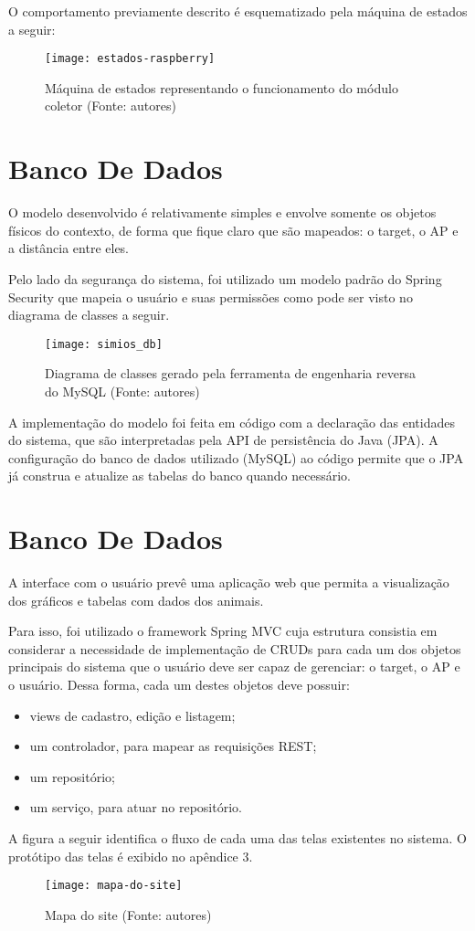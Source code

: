 O comportamento previamente descrito é esquematizado pela máquina de estados a seguir:

\begin{figure}[ht]
  \centering
    \texttt{[image: estados-raspberry]}
  \caption{Máquina de estados representando o funcionamento do módulo coletor (Fonte: autores)}
\end{figure}
\FloatBarrier

\section{Banco De Dados}

O modelo desenvolvido é relativamente simples e envolve somente os objetos físicos do contexto, de forma que fique claro que são mapeados: o target, o AP e a distância entre eles.

Pelo lado da segurança do sistema, foi utilizado um modelo padrão do Spring Security que mapeia o usuário e suas permissões como pode ser visto no diagrama de classes a seguir.

\begin{figure}[ht]
  \centering
    \texttt{[image: simios\_db]}
  \caption{Diagrama de classes gerado pela ferramenta de engenharia reversa do MySQL (Fonte: autores)}
\end{figure}
\FloatBarrier

A implementação do modelo foi feita em código com a declaração das entidades do sistema, que são interpretadas pela API de persistência do Java (JPA). A configuração do banco de dados utilizado (MySQL) ao código permite que o JPA já construa e atualize as tabelas do banco quando necessário.

\section{Banco De Dados}

A interface com o usuário prevê uma aplicação web que permita a visualização dos gráficos e tabelas com dados dos animais.

Para isso, foi utilizado o framework Spring MVC cuja estrutura consistia em considerar a necessidade de implementação de CRUDs para cada um dos objetos principais do sistema que o usuário deve ser capaz de gerenciar: o target, o AP e o usuário. Dessa forma, cada um destes objetos deve possuir:

\begin{itemize}
	\item views de cadastro, edição e listagem;
	\item um controlador, para mapear as requisições REST;
	\item um repositório;
	\item um serviço, para atuar no repositório.
\end{itemize}

A figura a seguir identifica o fluxo de cada uma das telas existentes no sistema. O protótipo das telas é exibido no apêndice 3.

\begin{figure}[ht]
  \centering
    \texttt{[image: mapa-do-site]}
  \caption{Mapa do site (Fonte: autores)}
\end{figure}
\FloatBarrier
